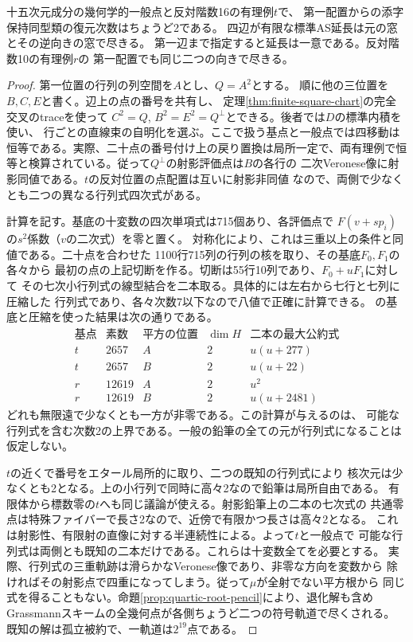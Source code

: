 \begin{theorem}\label{thm:exact-two-configurations}
十五次元成分の幾何学的一般点と反対階数16の有理例$t$で、
第一配置からの添字保持同型類の復元次数はちょうど2である。
四辺が有限な標準AS延長は元の窓とその逆向きの窓で尽きる。
第一辺まで指定すると延長は一意である。反対階数10の有理例$r$の
第一配置でも同じ二つの向きで尽きる。
\end{theorem}
\begin{proof}
第一位置の行列の列空間を$A$とし、$Q=A^2$とする。
順に他の三位置を$B,C,E$と書く。辺上の点の番号を共有し、
定理\ref{thm:finite-square-chart}の完全交叉のtraceを使って
$C^2=Q$, $B^2=E^2=Q^\perp$とできる。後者では$D$の標準内積を使い、
行ごとの直線束の自明化を選ぶ。ここで扱う基点と一般点では四移動は恒等である。実際、二十点の番号付け上の戻り置換は局所一定で、両有理例で恒等と検算されている。従って$Q^\perp$の射影評価点は$B$の各行の
二次Veronese像に射影同値である。$t$の反対位置の点配置は互いに射影非同値
なので、両側で少なくとも二つの異なる行列式四次式がある。

計算を記す。基底の十変数の四次単項式は715個あり、各評価点で
$F(v+s p_i)$の$s^2$係数（$v$の二次式）を零と置く。
対称化により、これは三重以上の条件と同値である。二十点を合わせた
1100行715列の行列の核を取り、その基底$F_0,F_1$の各々から
最初の点の上記切断を作る。切断は55行10列であり、$F_0+uF_1$に対して
その七次小行列式の線型結合を二本取る。具体的には左右から七行と七列に圧縮した
行列式であり、各々次数7以下なので八値で正確に計算できる。
の基底と圧縮を使った結果は次の通りである。
\[
\begin{array}{c|c|c|c|c}
 \text{基点}&\text{素数}&\text{平方の位置}&\dim H&\text{二本の最大公約式}\\\hline
 t&2657&A&2&u(u+277)\\
 t&2657&B&2&u(u+22)\\
 r&12619&A&2&u^2\\
 r&12619&B&2&u(u+2481)
\end{array}
\]
どれも無限遠で少なくとも一方が非零である。この計算が与えるのは、
可能な行列式を含む次数2の上界である。一般の鉛筆の全ての元が行列式になることは仮定しない。

$t$の近くで番号をエタール局所的に取り、二つの既知の行列式により
核次元は少なくとも2となる。上の小行列で同時に高々2なので鉛筆は局所自由である。
有限体から標数零の$t$へも同じ議論が使える。射影鉛筆上の二本の七次式の
共通零点は特殊ファイバーで長さ2なので、近傍で有限かつ長さは高々2となる。
これは射影性、有限射の直像に対する半連続性による。よって$t$と一般点で
可能な行列式は両側とも既知の二本だけである。これらは十変数全てを必要とする。
実際、行列式の三重軌跡は滑らかなVeronese像であり、非零な方向を変数から
除ければその射影点で四重になってしまう。従って$\mu$が全射でない平方根から
同じ式を得ることもない。命題\ref{prop:quartic-root-pencil}により、退化解も含め
Grassmannスキームの全幾何点が各側ちょうど二つの符号軌道で尽くされる。
既知の解は孤立被約で、一軌道は$2^{19}$点である。


\end{proof}
